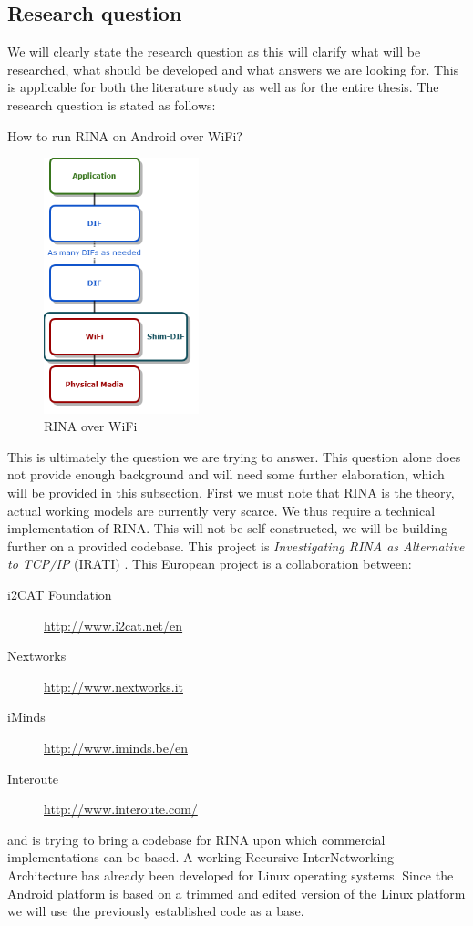 \subsection{Research question}
\label{ssec:research_question}
We will clearly state the research question as this will clarify what will be researched, what should be developed and what answers we are looking for. This is applicable for both the literature study as well as for the entire thesis. 
\npar
The research question is stated as follows: \\
\begin{highlight}How to run RINA on Android over WiFi?\end{highlight}

\begin{figure}[H]
    \centering
    \includegraphics[width=0.4\textwidth]{figures/rinaoverwifi}
    \caption{RINA over WiFi} 
    \label{fig:rinaoverwifi}
\end{figure}
This is ultimately the question we are trying to answer. This question alone does not provide enough background and will need some further elaboration, which will be provided in this subsection. 
\npar
First we must note that RINA is the theory, actual working models are currently very scarce. We thus require a technical implementation of RINA. This will not be self constructed, we will be building further on a provided codebase. This project is \emph{Investigating RINA as Alternative to TCP/IP} (IRATI) \citep{vrijders2014prototyping, website:irati}. This European project is a collaboration between: 
\begin{description}
	\item[i2CAT Foundation] \url{http://www.i2cat.net/en}
	\item[Nextworks] \url{http://www.nextworks.it}
	\item[iMinds] \url{http://www.iminds.be/en}
	\item[Interoute] \url{http://www.interoute.com/}
\end{description}
and is trying to bring a codebase for RINA upon which commercial implementations can be based. A working Recursive InterNetworking Architecture has already been developed for Linux operating systems. Since the Android platform is based on a trimmed and edited version of the Linux platform we will use the previously established code as a base. 
\npar


